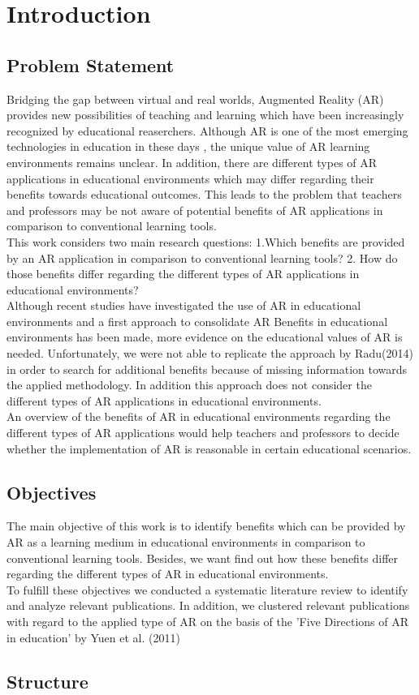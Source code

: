 \section{Introduction}
\subsection{Problem Statement}
Bridging the gap between virtual and real worlds, Augmented Reality (AR) provides new possibilities of teaching and learning which have been increasingly recognized by educational reaserchers. \autocite [cf.][41]{Wu.2013} Although AR is one of the most emerging technologies in education in these days \autocite [cf.]{Johnson.2010}, the unique value of AR learning environments remains unclear. \autocite [cf.][48]{Wu.2013} In addition, there are different types of AR applications in educational environments which may differ regarding their benefits towards educational outcomes. \autocite [cf.][127-130]{Yuen.2011} This leads to the problem that teachers and professors may be not aware of potential benefits of AR applications in comparison to conventional learning tools. \\
This work considers two main research questions: 1.Which benefits are provided by an AR application in comparison to conventional learning tools? 2. How do those benefits differ regarding the different types of AR applications in educational environments? \\
Although recent studies have investigated the use of AR in educational environments \autocite {Wu.2013}\mulcit\autocite {Lee.2012} and a first approach to consolidate AR Benefits in educational environments has been made, \autocite [cf.]{Radu.2014} more evidence on the educational values of AR is needed. Unfortunately, we were not able to replicate the approach by Radu(2014) in order to search for additional benefits because of missing information towards the applied methodology. In addition this approach does not consider the different types of AR applications in educational environments.\\
An overview of the benefits of AR in educational environments regarding the different types of AR applications would help teachers and professors to decide whether the implementation of AR is reasonable in certain educational scenarios.\\


\subsection{Objectives}
The main objective of this work is to identify benefits which can be provided by AR as a learning medium in educational environments in comparison to conventional learning tools. Besides, we want find out how these benefits differ regarding the different types of AR in educational environments. \\
To fulfill these objectives we conducted a systematic literature review to identify and analyze relevant publications. In addition, we clustered relevant publications with regard to the applied type of AR on the basis of the 'Five Directions of AR in education' by Yuen et al. (2011)
\subsection{Structure}